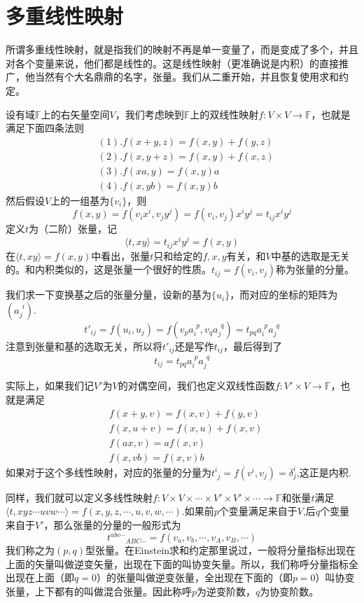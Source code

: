 \documentclass[11pt,a4paper,openany]{book}%
\theoremstyle{plain}%
\begin{document}
\section{多重线性映射}
所谓多重线性映射，就是指我们的映射不再是单一变量了，而是变成了多个，并且对各个变量来说，他们都是线性的。这是线性映射（更准确说是内积）的直接推广，他当然有个大名鼎鼎的名字，张量。我们从二重开始，并且恢复使用求和约定。

设有域$\mathbb{F}$上的右矢量空间$V$，我们考虑映到$\mathbb{F}$上的双线性映射$f:V\times V\rightarrow \mathbb{F}$，也就是满足下面四条法则
\begin{equation}
\begin{split}
&(1).f(x+y,z)=f(x,y)+f(y,z)\\
&(2).f(x,y+z)=f(x,y)+f(x,z)\\
&(3).f(xa,y)=f(x,y)a\\
&(4).f(x,yb)=f(x,y)b
\end{split}
\end{equation}
然后假设$V$上的一组基为$\{v_i\}$，则
\[
f(x,y)=f(v_ix^i,v_jy^j)=f(v_i,v_j)x^iy^j=t_{ij}x^iy^j
\]
定义$t$为{\kaishu （二阶）张量}，记
\[
\langle t,xy\rangle=t_{ij}x^iy^j=f(x,y)
\]
在$\langle t,xy\rangle=f(x,y)$中看出，张量$t$只和给定的$f,x,y$有关，和$V$中基的选取是无关的。和内积类似的，这是张量一个很好的性质。$t_{ij}=f(v_i,v_j)$称为张量的分量。

我们求一下变换基之后的张量分量，设新的基为$\{u_i\}$，而对应的坐标的矩阵为$(a^{\phantom{j}i}_j)$.
\[
t'_{ij}=f(u_i,u_j)=f(v_pa^{\phantom{i}p}_i,v_qa^{\phantom{j}q}_j)=t_{pq}a^{\phantom{i}p}_ia^{\phantom{j}q}_j
\]
注意到张量和基的选取无关，所以将$t'_{ij}$还是写作$t_{ij}$，最后得到了
\[
t_{ij}=t_{pq}a^{\phantom{i}p}_ia^{\phantom{j}q}_j
\]

实际上，如果我们记$V'$为$V$的对偶空间，我们也定义双线性函数$f:V'\times V\rightarrow \mathbb{F}$，也就是满足
\begin{eqnarray}
\label{张量}
&f(x+y,v)=f(x,v)+f(y,v)\\
&f(x,u+v)=f(x,u)+f(x,v)\\
&f(ax,v)=af(x,v)\\
&f(x,vb)=f(x,v)b
\end{eqnarray}
如果对于这个多线性映射，对应的张量的分量为$t^i_{\phantom{i}j}=f(v^i,v_j)=\delta_j^i$,这正是内积.

同样，我们就可以定义多线性映射$f:V\times V  \times \cdots  \times V'\times V' \times\cdots \rightarrow \mathbb{F}$和张量$t$满足$\langle t,xyz\cdots uvw\cdots \rangle=f(x,y,z,\cdots,u,v,w,\cdots)$.如果前$p$个变量满足来自于$V$,后$q$个变量来自于$V'$，那么张量的分量的一般形式为
\[
t^{abc\cdots}_{\phantom{abc\cdots}ABC\cdots}=f(v_a,v_b,\cdots,v_A,v_B,\cdots)
\]
我们称之为$(p,q)$型张量。在Einstein求和约定那里说过，一般将分量指标出现在上面的矢量叫做逆变矢量，出现在下面的叫协变矢量。所以，我们称呼分量指标全出现在上面（即$q=0$）的张量叫做逆变张量，全出现在下面的（即$p=0$）叫协变张量，上下都有的叫做混合张量。因此称呼$p$为逆变阶数，$q$为协变阶数。
\end{document}

